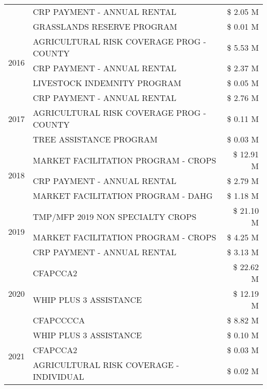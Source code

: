 \begin{tabular}{llr}
 & CRP PAYMENT - ANNUAL RENTAL & \$ 2.05 M \\
 & GRASSLANDS RESERVE PROGRAM & \$ 0.01 M \\
\cline{1-3}
\multirow[t]{3}{*}{2016} & AGRICULTURAL RISK COVERAGE PROG - COUNTY & \$ 5.53 M \\
 & CRP PAYMENT - ANNUAL RENTAL & \$ 2.37 M \\
 & LIVESTOCK INDEMNITY PROGRAM & \$ 0.05 M \\
\cline{1-3}
\multirow[t]{3}{*}{2017} & CRP PAYMENT - ANNUAL RENTAL & \$ 2.76 M \\
 & AGRICULTURAL RISK COVERAGE PROG - COUNTY & \$ 0.11 M \\
 & TREE ASSISTANCE PROGRAM & \$ 0.03 M \\
\cline{1-3}
\multirow[t]{3}{*}{2018} & MARKET FACILITATION PROGRAM - CROPS & \$ 12.91 M \\
 & CRP PAYMENT - ANNUAL RENTAL & \$ 2.79 M \\
 & MARKET FACILITATION PROGRAM - DAHG & \$ 1.18 M \\
\cline{1-3}
\multirow[t]{3}{*}{2019} & TMP/MFP 2019 NON SPECIALTY CROPS & \$ 21.10 M \\
 & MARKET FACILITATION PROGRAM - CROPS & \$ 4.25 M \\
 & CRP PAYMENT - ANNUAL RENTAL & \$ 3.13 M \\
\cline{1-3}
\multirow[t]{3}{*}{2020} & CFAPCCA2 & \$ 22.62 M \\
 & WHIP PLUS 3 ASSISTANCE & \$ 12.19 M \\
 & CFAPCCCCA & \$ 8.82 M \\
\cline{1-3}
\multirow[t]{3}{*}{2021} & WHIP PLUS 3 ASSISTANCE & \$ 0.10 M \\
 & CFAPCCA2 & \$ 0.03 M \\
 & AGRICULTURAL RISK COVERAGE - INDIVIDUAL & \$ 0.02 M \\
\cline{1-3}
\bottomrule
\end{tabular}
